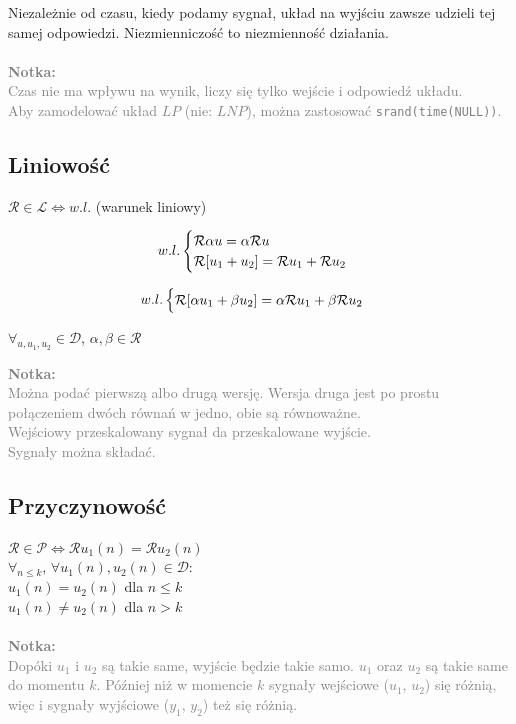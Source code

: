 \documentclass[12pt]{scrartcl}
\newcommand{\code}[1]{\texttt{#1}}
\newcommand{\fancy}[1]{\mathcal{#1}}
\newcommand{\notka}[1]{
	\textcolor{gray}{\textbf{Notka:\\\indent} #1}
}
\begin{document}
	Niezależnie od czasu, kiedy podamy sygnał, układ na wyjściu zawsze udzieli tej samej odpowiedzi.
	Niezmienniczość to niezmienność działania.\\\\
\notka{
	Czas nie ma wpływu na wynik, liczy się tylko wejście i odpowiedź układu.
	\\Aby zamodelować układ $LP$ (nie: $LNP$), można zastosować \code{srand(time(NULL))}.
}
	\subsection{Liniowość}\label{sec:liniowosc}
	$ \fancy{R} \in \fancy{L} \Leftrightarrow w.l. $ (warunek liniowy)
	
	
	\[ w.l.
		\begin{cases}
		 	$$\fancy{R} \alpha u = \alpha \fancy{R}u\\
			\fancy{R} [ u_1 + u_2 ] = \fancy{R}u_1 + \fancy{R}u_2$$
		\end{cases}
	\]
	
	\[ w.l.
		\begin{cases}
			$$ \fancy{R}[ \alpha u_1 + \beta u_2 ] = \alpha \fancy{R}u_1 + \beta \fancy{R} u_2 $$
		\end{cases}
	\]
	\begin{center}
		$\forall_{u, u_1, u_2} \in \fancy{D}$, $\alpha, \beta \in \fancy{R}$
	\end{center}

	
\notka{
	Można podać pierwszą albo drugą wersję. Wersja druga jest po prostu połączeniem dwóch równań w jedno, obie są równoważne.\\
	Wejściowy przeskalowany sygnał da przeskalowane wyjście.\\
	Sygnały można składać.
}
	
\subsection{Przyczynowość}\label{sec:przyczynowosc}
	
	$ \fancy{R} \in \fancy{P} \Leftrightarrow \fancy{R}u_1(n) = \fancy{R}u_2(n) $\\
	$ \forall_{n \le k} $, $ \forall u_1(n), u_2(n) \in \fancy{D} $:\\
	\indent\indent\indent $ u_1(n) = u_2(n) $ dla $ n \le k $\\
	\indent\indent\indent $ u_1(n) \ne u_2(n) $ dla $ n > k $\\\\
\notka{
	Dopóki $u_1$ i $u_2$ są takie same, wyjście będzie takie samo. $u_1$ oraz $u_2$ są takie same do momentu $k$. Później niż w momencie $k$ sygnały wejściowe ($u_1$, $u_2$) się różnią, więc i sygnały wyjściowe ($y_1$, $y_2$) też się różnią.
}
	
\end{document}
